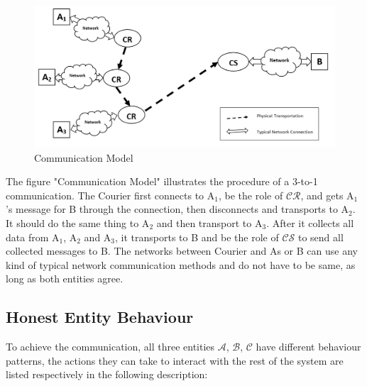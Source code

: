 \begin{figure}[h!]
\includegraphics[width=\textwidth,natwidth=1123,natheight=530]{figures/communicationmodel.png}
\caption{Communication Model}
\end{figure}

The figure "Communication Model" illustrates the procedure of a 3-to-1 communication. The Courier first connects to A$_1$, be the role of $\mathcal{CR}$, and gets A$_1$'s message for B through the connection, then disconnects and transports to A$_2$. It should do the same thing to A$_2$ and then transport to A$_3$. After it collects all data from A$_1$, A$_2$ and A$_3$, it transports to B and be the role of $\mathcal{CS}$ to send all collected messages to B. The networks between Courier and As or B can use any kind of typical network communication methods and do not have to be same, as long as both entities agree. 

\subsection{Honest Entity Behaviour}
To achieve the communication, all three entities $ \mathcal{A} $, $ \mathcal{B} $, $ \mathcal{C} $ have different behaviour patterns, the actions they can take to interact with the rest of the system are listed respectively in the following description:

